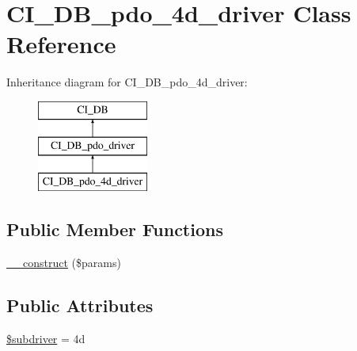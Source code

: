 \hypertarget{class_c_i___d_b__pdo__4d__driver}{}\section{C\+I\+\_\+\+D\+B\+\_\+pdo\+\_\+4d\+\_\+driver Class Reference}
\label{class_c_i___d_b__pdo__4d__driver}
Inheritance diagram for C\+I\+\_\+\+D\+B\+\_\+pdo\+\_\+4d\+\_\+driver\+:\begin{figure}[H]
\begin{center}
\leavevmode
\includegraphics[height=3.000000cm]{class_c_i___d_b__pdo__4d__driver}
\end{center}
\end{figure}
\subsection*{Public Member Functions}
\begin{DoxyCompactItemize}
\item 
\mbox{\hyperlink{class_c_i___d_b__pdo__4d__driver_a9162320adff1a1a4afd7f2372f753a3e}{\+\_\+\+\_\+construct}} (\$params)
\end{DoxyCompactItemize}
\subsection*{Public Attributes}
\begin{DoxyCompactItemize}
\item 
\mbox{\hyperlink{class_c_i___d_b__pdo__4d__driver_a1322ca756348b11d080cb7a4f590de15}{\$subdriver}} = \textquotesingle{}4d\textquotesingle{}
\end{DoxyCompactItemize}
